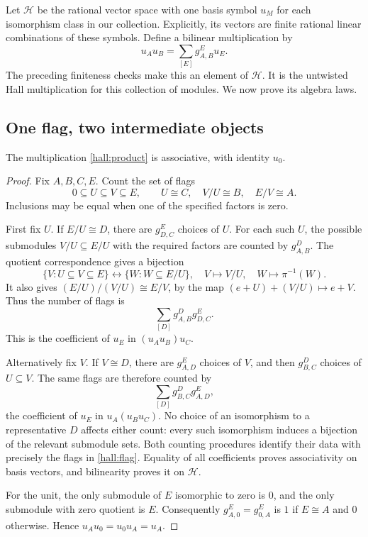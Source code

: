 Let $\mathcal H$ be the rational vector space with one basis symbol
$u_M$ for each isomorphism class in our collection. Explicitly, its
vectors are finite rational linear combinations of these symbols.
Define a bilinear multiplication by
\begin{equation}\label{hall:product}
u_Au_B=\sum_{[E]}g_{A,B}^{E}u_E.
\end{equation}
The preceding finiteness checks make this an element of $\mathcal H$.
It is the untwisted Hall multiplication for this collection of modules.
We now prove its algebra laws.

\subsection{One flag, two intermediate objects}

\begin{theorem}\label{hall:associativity}
The multiplication \eqref{hall:product} is associative, with identity $u_0$.
\end{theorem}

\begin{proof}
Fix $A,B,C,E$. Count the set of flags
\begin{equation}\label{hall:flag}
0\subseteq U\subseteq V\subseteq E,
\qquad U\cong C,\quad V/U\cong B,\quad E/V\cong A.
\end{equation}
Inclusions may be equal when one of the specified factors is zero.

First fix $U$. If $E/U\cong D$, there are $g_{D,C}^{E}$ choices of $U$.
For each such $U$, the possible submodules $V/U\subseteq E/U$ with
the required factors are counted by $g_{A,B}^{D}$. The quotient
correspondence gives a bijection
\[
\{V:U\subseteq V\subseteq E\}
\longleftrightarrow
\{W:W\subseteq E/U\},
\quad V\longmapsto V/U,\quad W\longmapsto\pi^{-1}(W).
\]
It also gives $(E/U)/(V/U)\cong E/V$, by the map
$(e+U)+(V/U)\mapsto e+V$. Thus the number of flags is
\[
\sum_{[D]}g_{A,B}^{D}g_{D,C}^{E}.
\]
This is the coefficient of $u_E$ in $(u_Au_B)u_C$.

Alternatively fix $V$. If $V\cong D$, there are $g_{A,D}^{E}$ choices
of $V$, and then $g_{B,C}^{D}$ choices of $U\subseteq V$.
The same flags are therefore counted by
\[
\sum_{[D]}g_{B,C}^{D}g_{A,D}^{E},
\]
the coefficient of $u_E$ in $u_A(u_Bu_C)$. No choice of an isomorphism
to a representative $D$ affects either count: every such isomorphism
induces a bijection of the relevant submodule sets. Both counting
procedures identify their data with precisely the flags in
\eqref{hall:flag}. Equality of all coefficients proves associativity on
basis vectors, and bilinearity proves it on $\mathcal H$.

For the unit, the only submodule of $E$ isomorphic to zero is $0$,
and the only submodule with zero quotient is $E$. Consequently
$g_{A,0}^{E}=g_{0,A}^{E}$ is $1$ if $E\cong A$ and $0$ otherwise.
Hence $u_Au_0=u_0u_A=u_A$.
\end{proof}

